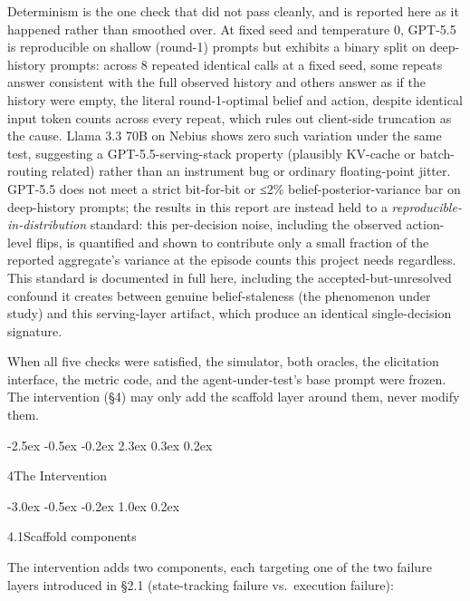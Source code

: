 \documentclass[
  11pt,
]{article}
\makeatletter
\renewcommand{\section}{%
  \@startsection{section}{1}{\z@}%
                {-2.5ex \@plus -0.5ex \@minus -0.2ex}%
                { 2.3ex \@plus  0.3ex \@minus  0.2ex}%
                {\large\bf\raggedright}%
}
\renewcommand{\subsection}{%
  \@startsection{subsection}{2}{\z@}%
                {-3.0ex \@plus -0.5ex \@minus -0.2ex}%
                { 1.0ex \@plus  0.2ex}%
                {\normalsize\bf\raggedright}%
}
\makeatother
\begin{document}
\begin{enumerate}
  Determinism is the one check that did not pass cleanly, and is reported here as it happened rather than smoothed over. At fixed seed and temperature 0, GPT-5.5 is reproducible on shallow (round-1) prompts but exhibits a binary split on deep-history prompts: across 8 repeated identical calls at a fixed seed, some repeats answer consistent with the full observed history and others answer as if the history were empty, the literal round-1-optimal belief and action, despite identical input token counts across every repeat, which rules out client-side truncation as the cause. Llama 3.3 70B on Nebius shows zero such variation under the same test, suggesting a GPT-5.5-serving-stack property (plausibly KV-cache or batch-routing related) rather than an instrument bug or ordinary floating-point jitter. GPT-5.5 does not meet a strict bit-for-bit or ≤2\% belief-posterior-variance bar on deep-history prompts; the results in this report are instead held to a \emph{reproducible-in-distribution} standard: this per-decision noise, including the observed action-level flips, is quantified and shown to contribute only a small fraction of the reported aggregate's variance at the episode counts this project needs regardless. This standard is documented in full here, including the accepted-but-unresolved confound it creates between genuine belief-staleness (the phenomenon under study) and this serving-layer artifact, which produce an identical single-decision signature.
\end{enumerate}

When all five checks were satisfied, the simulator, both oracles, the elicitation interface, the metric code, and the agent-under-test's base prompt were frozen. The intervention (§4) may only add the scaffold layer around them, never modify them.

\section{4\quad The Intervention}\label{the-intervention}

\subsection{4.1\quad Scaffold components}\label{scaffold-components}

The intervention adds two components, each targeting one of the two failure layers introduced in §2.1 (state-tracking failure vs.~execution failure):
\end{document}
